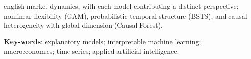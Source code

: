 \documentclass[	12pt, Times, openright, oneside, a4paper, english, brazil]{abntex2}
\begin{document}
\begin{resumo}[Abstract]
\begin{otherlanguage*}{english}
market dynamics, with each model contributing a distinct perspective: nonlinear flexibility (GAM), probabilistic temporal structure (BSTS), and causal heterogeneity with global dimension (Causal Forest).
   \vspace{\onelineskip}

   \noindent
   \textbf{Key-words}: explanatory models; interpretable machine learning; macroeconomics; time series; applied artificial intelligence.
 \end{otherlanguage*}
\end{resumo}

\listoffigures*
\cleardoublepage

\listoftables*
\cleardoublepage
\end{document}
